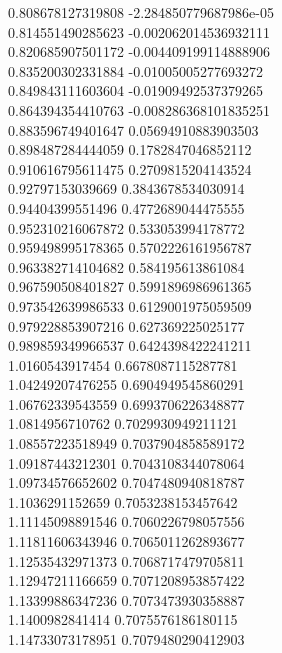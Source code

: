 {0.808678127319808 -2.284850779687986e-05 \\
0.814551490285623 -0.002062014536932111 \\
0.820685907501172 -0.004409199114888906 \\
0.835200302331884 -0.01005005277693272 \\
0.849843111603604 -0.01909492537379265 \\
0.864394354410763 -0.008286368101835251 \\
0.883596749401647 0.05694910883903503 \\
0.898487284444059 0.1782847046852112 \\
0.910616795611475 0.2709815204143524 \\
0.92797153039669 0.3843678534030914 \\
0.94404399551496 0.4772689044475555 \\
0.952310216067872 0.533053994178772 \\
0.959498995178365 0.5702226161956787 \\
0.963382714104682 0.584195613861084 \\
0.967590508401827 0.5991896986961365 \\
0.973542639986533 0.6129001975059509 \\
0.979228853907216 0.627369225025177 \\
0.989859349966537 0.6424398422241211 \\
1.0160543917454 0.6678087115287781 \\
1.04249207476255 0.6904949545860291 \\
1.06762339543559 0.6993706226348877 \\
1.0814956710762 0.7029930949211121 \\
1.08557223518949 0.7037904858589172 \\
1.09187443212301 0.7043108344078064 \\
1.09734576652602 0.7047480940818787 \\
1.1036291152659 0.7053238153457642 \\
1.11145098891546 0.7060226798057556 \\
1.11811606343946 0.7065011262893677 \\
1.12535432971373 0.7068717479705811 \\
1.12947211166659 0.7071208953857422 \\
1.13399886347236 0.7073473930358887 \\
1.1400982841414 0.7075576186180115 \\
1.14733073178951 0.7079480290412903 \\
}
